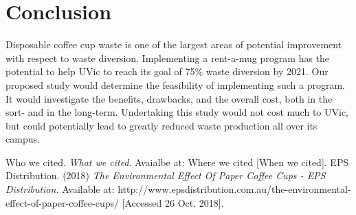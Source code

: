 \documentclass[letterpaper,11pt]{texMemo}
\begin{document}
\section*{Conclusion}
Disposable coffee cup waste is one of the largest areas of potential
improvement with respect to waste diversion.  Implementing a rent-a-mug
program has the potential to help UVic to reach its goal of 75\% waste diversion
by 2021.
\newline
\newline
Our proposed study would determine the feasibility of implementing such a
program. It would investigate the benefits, drawbacks, and the overall cost,
both in the sort- and in the long-term. Undertaking this study would not cost
much to UVic, but could potentially lead to greatly reduced waste production
all over its campus.

\begin{thebibliography}{9}
	Who we cited.
	\textit{What we cited}.
	Avaialbe at: Where we cited
	[When we cited].
	EPS Distribution. (2018)
	\textit{The Environmental Effect Of Paper Coffee Cups \-- EPS Distribution.}
	Available at:
	http://www.epsdistribution.com.au/the-environmental-effect-of-paper-coffee-cups/
	[Accessed 26 Oct. 2018].

\end{thebibliography}
\end{document}
